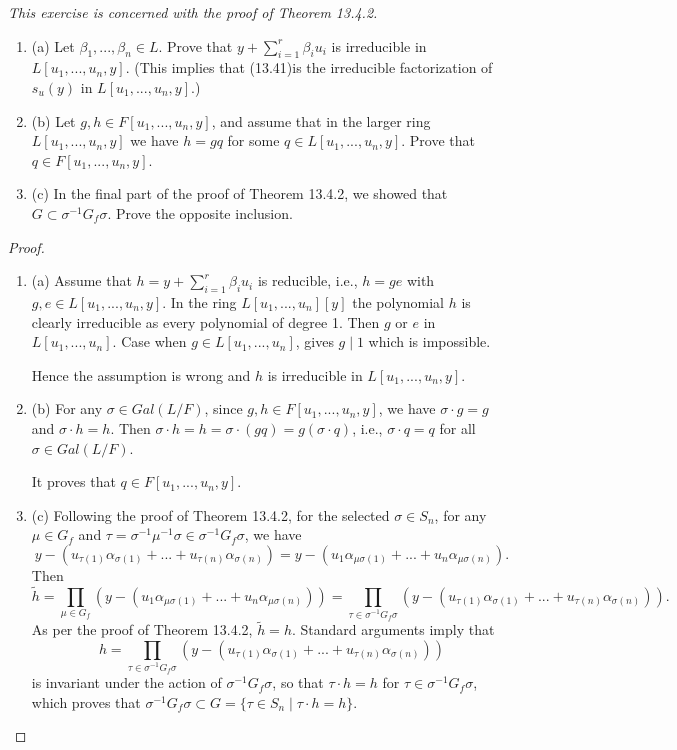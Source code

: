 \documentclass[11pt,a4paper]{article}
\newcommand{\be} {\begin{enumerate}}
\newcommand{\ee} {\end{enumerate}}
\begin{document}
{\it This exercise is concerned with the proof of Theorem 13.4.2.
\be
\item[(a)] Let $\beta_1,...,\beta_n\in L$. Prove that $y+\sum_{i=1}^r\beta_iu_i$ is irreducible in $L[u_1,...,u_n,y]$. (This implies that (13.41)is the irreducible factorization of $s_u(y)$ in $L[u_1,...,u_n,y]$.)
\item[(b)] Let $g,h\in F[u_1,...,u_n,y]$, and assume that in the larger ring $L[u_1,...,u_n,y]$ we have $h=gq$ for some $q\in L[u_1,...,u_n,y]$. Prove that $q\in F[u_1,...,u_n,y]$.
\item[(c)] In the final part of the proof of Theorem 13.4.2, we showed that $G\subset\sigma^{-1}G_f\sigma$. Prove the opposite inclusion.
\ee
\begin{proof}
\be
\item[(a)] Assume that $h=y+\sum_{i=1}^r\beta_iu_i$ is reducible, i.e., $h=ge$ with $g,e\in L[u_1,...,u_n,y]$. In the ring $L[u_1,...,u_n][y]$ the polynomial $h$ is clearly irreducible as every polynomial of degree 1. Then $g$ or $e$ in $L[u_1,...,u_n]$. Case when $g\in L[u_1,...,u_n]$, gives $g\mid 1$ which is impossible. 

Hence the assumption is wrong and $h$ is irreducible in $L[u_1,...,u_n,y]$.
\item[(b)] For any $\sigma\in Gal(L/F)$, since $g,h\in F[u_1,...,u_n,y]$, we have $\sigma \cdot g=g$ and $\sigma \cdot h=h$. Then $\sigma \cdot h=h=\sigma\cdot (gq)=g(\sigma\cdot q)$, i.e., $\sigma\cdot q=q$ for all $\sigma\in Gal(L/F)$.

It proves that $q\in F[u_1,...,u_n,y]$.
\item[(c)] Following the proof of Theorem 13.4.2, for the selected $\sigma\in S_n$, for any $\mu\in G_f$ and $\tau=\sigma^{-1}\mu^{-1}\sigma\in\sigma^{-1}G_f\sigma$, we have
$$y-(u_{\tau(1)}\alpha_{\sigma(1)}+...+u_{\tau(n)}\alpha_{\sigma(n)})=y-(u_{1}\alpha_{\mu\sigma(1)}+...+u_{n}\alpha_{\mu\sigma(n)}).$$
Then
$$\tilde{h}=\prod_{\mu\in G_f}(y-(u_{1}\alpha_{\mu\sigma(1)}+...+u_{n}\alpha_{\mu\sigma(n)})) = \prod_{\tau\in\sigma^{-1}G_f\sigma}(y-(u_{\tau(1)}\alpha_{\sigma(1)}+...+u_{\tau(n)}\alpha_{\sigma(n)})). $$
As per the proof of Theorem 13.4.2, $\tilde{h}=h$. Standard arguments imply that 
$$h= \prod_{\tau\in\sigma^{-1}G_f\sigma}(y-(u_{\tau(1)}\alpha_{\sigma(1)}+...+u_{\tau(n)}\alpha_{\sigma(n)}))$$
is invariant under the action of $\sigma^{-1}G_f\sigma$, so that $\tau\cdot h=h$ for $\tau\in\sigma^{-1}G_f\sigma$, which proves that $\sigma^{-1}G_f\sigma\subset G=\{\tau\in S_n \mid \tau\cdot h=h\}$. 
\ee\end{proof}
}
\end{document}
